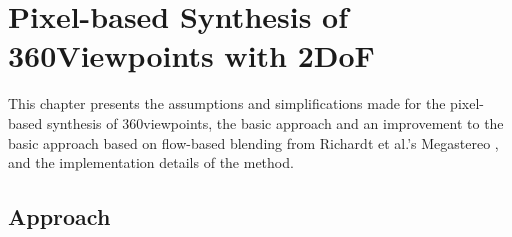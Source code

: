 \chapter{Pixel-based Synthesis of 360\degree Viewpoints with 2DoF}\label{chap:implementation}


This chapter presents the assumptions and simplifications made for the pixel-based synthesis of 360\degree viewpoints, the basic approach and an improvement to the basic approach based on flow-based blending from Richardt et al.'s Megastereo \cite{megastereo}, and the implementation details of the method.

\section{Approach} \label{sec:approach}

